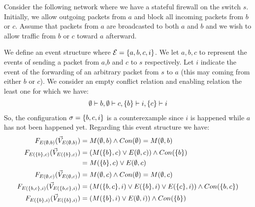 \begin{example}
    Consider the following network where we have
    a stateful firewall on the switch $s$.
    Initially, we allow outgoing packets from $a$ and
    block all incoming packets from $b$ or $c$.
    Assume that packets from $a$ are broadcasted to
    both $a$ and $b$ and we wish to allow traffic
    from $b$ or $c$ toward $a$ afterward.
    \begin{center}
    \end{center}
    We define an event structure where
    $\mathcal{E} = \{a,b,c,i\}$.
    We let $a,b,c$ to represent the events of sending
    a packet from $a$,$b$ and $c$ to $s$ respectively.
    Let $i$ indicate the event of the forwarding of
    an arbitrary packet from $s$ to $a$ (this may coming
    from either $b$ or $c$).
    We consider an empty conflict relation and enabling
    relation the least one for which we have:
    \begin{align*}
        \emptyset \vdash b, \emptyset \vdash c,
        \{b\} \vdash i, \{c\} \vdash i
    \end{align*}
    So, the configuration $\sigma = \{b,c,i\}$ is a
    counterexample since $i$ is happened while $a$
    has not been happened yet.
    Regarding this event structure we have:
    \begin{align*}
        \f{E(\e,b)}      & = M(\e,b) \wedge Con(\e) = M(\e,b)                                   \\
        \f{E(\s{b},c)}   & = (M(\s{b},c) \vee E(\e,c)) \wedge Con(\s{b})                        \\
                         & = M(\s{b},c) \vee E(\e,c)                                            \\
        \f{E(\e,c)}      & = M(\e,c) \wedge Con(\e)  = M(\e,c)                                  \\
        \f{E(\s{b,c},i)} & = (M(\s{b,c},i) \vee E(\s{b},i) \vee E(\s{c},i))
        \wedge Con(\s{b,c})                                                                     \\
        \f{E(\s{b},i)}   & = (M(\s{b},i) \vee E(\e,i))\wedge Con(\s{b})                         \\

\end{align*}
\end{example}
